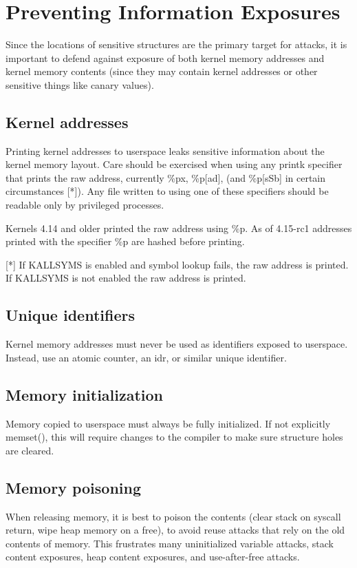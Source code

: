 \documentclass[a4paper,8pt,english]{sphinxmanual}
\begin{document}
\section{Preventing Information Exposures}
\label{security/self-protection:preventing-information-exposures}
Since the locations of sensitive structures are the primary target for
attacks, it is important to defend against exposure of both kernel memory
addresses and kernel memory contents (since they may contain kernel
addresses or other sensitive things like canary values).


\subsection{Kernel addresses}
\label{security/self-protection:kernel-addresses}
Printing kernel addresses to userspace leaks sensitive information about
the kernel memory layout. Care should be exercised when using any printk
specifier that prints the raw address, currently \%px, \%p{[}ad{]}, (and \%p{[}sSb{]}
in certain circumstances {[}*{]}).  Any file written to using one of these
specifiers should be readable only by privileged processes.

Kernels 4.14 and older printed the raw address using \%p. As of 4.15-rc1
addresses printed with the specifier \%p are hashed before printing.

{[}*{]} If KALLSYMS is enabled and symbol lookup fails, the raw address is
printed. If KALLSYMS is not enabled the raw address is printed.


\subsection{Unique identifiers}
\label{security/self-protection:unique-identifiers}
Kernel memory addresses must never be used as identifiers exposed to
userspace. Instead, use an atomic counter, an idr, or similar unique
identifier.


\subsection{Memory initialization}
\label{security/self-protection:memory-initialization}
Memory copied to userspace must always be fully initialized. If not
explicitly memset(), this will require changes to the compiler to make
sure structure holes are cleared.


\subsection{Memory poisoning}
\label{security/self-protection:memory-poisoning}
When releasing memory, it is best to poison the contents (clear stack on
syscall return, wipe heap memory on a free), to avoid reuse attacks that
rely on the old contents of memory. This frustrates many uninitialized
variable attacks, stack content exposures, heap content exposures, and
use-after-free attacks.
\end{document}
